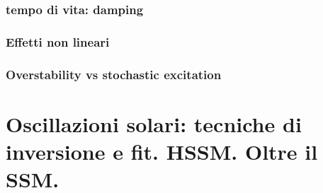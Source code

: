 \documentclass[../main.tex]{subfiles}
\begin{document}
\begin{refsection}
\subsection{tempo di vita: damping}
\subsection{Effetti non lineari}
\subsection{Overstability vs stochastic excitation}



\end{refsection}
{\let\clearpage\relax
\chapter{Oscillazioni solari: tecniche di inversione e fit. HSSM. Oltre il SSM.}}
\PartialToc

\begin{refsection}


\end{refsection}

\stopcontent[chapter]
\end{document}
